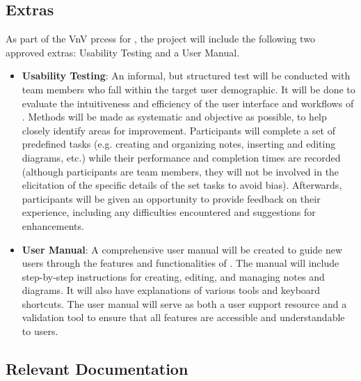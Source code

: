 \documentclass[12pt, titlepage]{article}
\begin{document}
\subsection{Extras}


\noindent As part of the VnV prcess for \progname{}, the project will include the 
following two approved extras: Usability Testing and a User Manual.

\begin{itemize}
  \item \textbf{Usability Testing}: An informal, but structured test will be 
  conducted with team members who fall within the target user demographic. It 
  will be done to evaluate the intuitiveness and efficiency of the user interface
  and workflows of \progname{}. Methods will be made as systematic and objective 
  as possible, to help closely identify areas for improvement. Participants will
  complete a set of predefined tasks (e.g. creating and organizing notes, inserting
  and editing diagrams, etc.) while their performance and completion times are
  recorded (although participants are team members, they will not be involved in
  the elicitation of the specific details of the set tasks to avoid bias).
  Afterwards, participants will be given an opportunity to provide feedback on 
  their experience, including any difficulties encountered and suggestions for 
  enhancements.
  \item \textbf{User Manual}: A comprehensive user manual will be created to
  guide new users through the features and functionalities of \progname{}. The
  manual will include step-by-step instructions for creating, editing, and 
  managing notes and diagrams. It will also have explanations of various tools
  and keyboard shortcuts. The user manual will serve as both a user support 
  resource and a validation tool to ensure that all features are accessible and
  understandable to users.
\end{itemize}

\subsection{Relevant Documentation}
\end{document}
